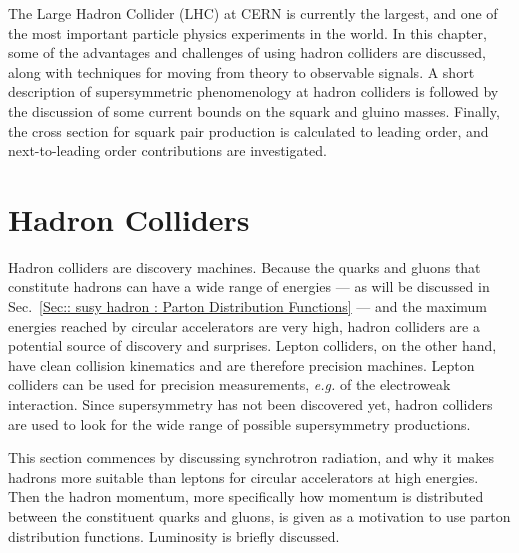 \documentclass[twoside,english]{uiofysmaster}
\begin{document}
{The Large Hadron Collider (LHC) at CERN is currently the largest, and one of the most important particle physics experiments in the world. In this chapter, some of the advantages and challenges of using hadron colliders are discussed, along with techniques for moving from theory to observable signals. A short description of supersymmetric phenomenology at hadron colliders is followed by the discussion of some current bounds on the squark and gluino masses. Finally, the cross section for squark pair production is calculated to leading order, and next-to-leading order contributions are investigated.

\section{Hadron Colliders}\label{Sec:: susy hadron : Hadron Colliders}

Hadron colliders are discovery machines. Because the quarks and gluons that constitute hadrons can have a wide range of energies --- as will be discussed in Sec.~\ref{Sec:: susy hadron : Parton Distribution Functions} --- and the maximum energies reached by circular accelerators are very high, hadron colliders are a potential source of discovery and surprises. Lepton colliders, on the other hand, have clean collision kinematics and are therefore precision machines. Lepton colliders can be used for precision measurements, \textit{e.g.} of the electroweak interaction. Since supersymmetry has not been discovered yet, hadron colliders are used to look for the wide range of possible supersymmetry productions. 

This section commences by discussing synchrotron radiation, and why it makes hadrons more suitable than leptons for circular accelerators at high energies. Then the hadron momentum, more specifically how momentum is distributed between the constituent quarks and gluons, is given as a motivation to use parton distribution functions. Luminosity is briefly discussed.  


}
\end{document}
